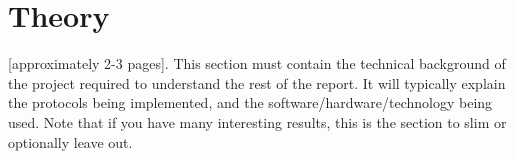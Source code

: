 \section{Theory}

[approximately 2-3 pages]. This section must contain the technical background
of the project required to understand the rest of the report. It will typically explain
the protocols being implemented, and the software/hardware/technology being used. Note
that if you have many interesting results, this is the section to slim or optionally leave out.








\pagebreak